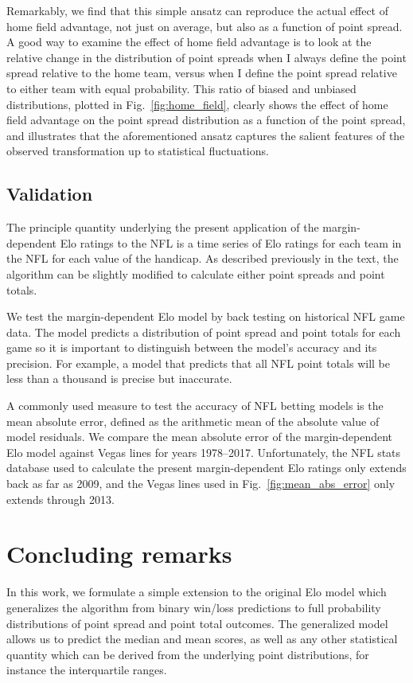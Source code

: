 \documentclass[aps,prc,reprint,amsmath,superscriptaddress]{revtex4-1}
\begin{document}
Remarkably, we find that this simple ansatz can reproduce the actual effect of home field advantage, not just on average, but also as a function of point spread.
A good way to examine the effect of home field advantage is to look at the relative change in the distribution of point spreads when I always define the point spread relative to the home team, versus when I define the point spread relative to either team with equal probability.
This ratio of biased and unbiased distributions, plotted in Fig.~\ref{fig:home_field}, clearly shows the effect of home field advantage on the point spread distribution as a function of the point spread, and illustrates that the aforementioned ansatz captures the salient features of the observed transformation up to statistical fluctuations.

\subsection{Validation}

The principle quantity underlying the present application of the margin-dependent Elo ratings to the NFL is a time series of Elo ratings for each team in the NFL for each value of the handicap.
As described previously in the text, the algorithm can be slightly modified to calculate either point spreads and point totals.

We test the margin-dependent Elo model by back testing on historical NFL game data.
The model predicts a distribution of point spread and point totals for each game so it is important to distinguish between the model's accuracy and its precision. 
For example, a model that predicts that all NFL point totals will be less than a thousand is precise but inaccurate.

A commonly used measure to test the accuracy of NFL betting models is the mean absolute error, defined as the arithmetic mean of the absolute value of model residuals.
We compare the mean absolute error of the margin-dependent Elo model against Vegas lines  for years {1978--2017}.
Unfortunately, the NFL stats database used to calculate the present margin-dependent Elo ratings only extends back as far as 2009, and the Vegas lines used in Fig.~\ref{fig:mean_abs_error} only extends through 2013.

\section{Concluding remarks}

In this work, we formulate a simple extension to the original Elo model which generalizes the algorithm from binary win/loss predictions to full probability distributions of point spread and point total outcomes.
The generalized model allows us to predict the median and mean scores, as well as any other statistical quantity which can be derived from the underlying point distributions, for instance the interquartile ranges. 
\end{document}
